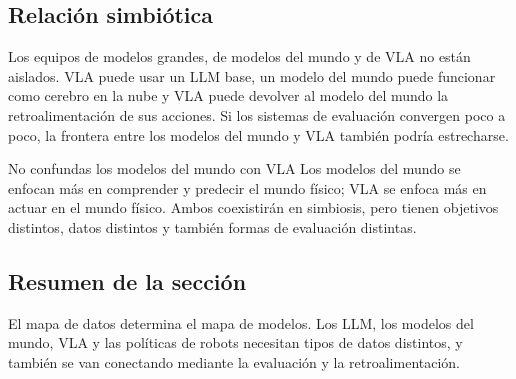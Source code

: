 \subsection{Relación simbiótica}

Los equipos de modelos grandes, de modelos del mundo y de VLA no están aislados. VLA puede usar un LLM base, un modelo del mundo puede funcionar como cerebro en la nube y VLA puede devolver al modelo del mundo la retroalimentación de sus acciones. Si los sistemas de evaluación convergen poco a poco, la frontera entre los modelos del mundo y VLA también podría estrecharse.

\begin{warningbox}{No confundas los modelos del mundo con VLA}
Los modelos del mundo se enfocan más en comprender y predecir el mundo físico; VLA se enfoca más en actuar en el mundo físico. Ambos coexistirán en simbiosis, pero tienen objetivos distintos, datos distintos y también formas de evaluación distintas.
\end{warningbox}

\subsection{Resumen de la sección}

El mapa de datos determina el mapa de modelos. Los LLM, los modelos del mundo, VLA y las políticas de robots necesitan tipos de datos distintos, y también se van conectando mediante la evaluación y la retroalimentación.
